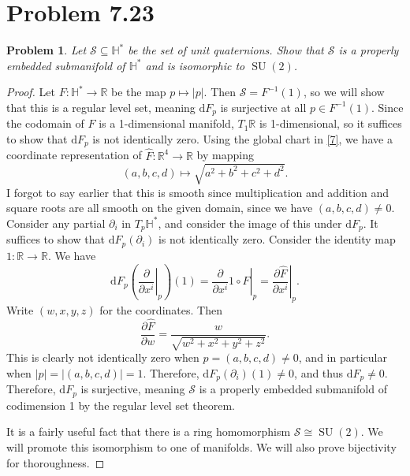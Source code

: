 \documentclass[11pt, letterpaper]{article}
\theoremstyle{plain}
\newtheorem{problem}{Problem}
\begin{document}
\section{Problem 7.23}
\begin{problem}
	Let $\mathcal{S} \subseteq \mathbb{H} ^*$ be the set of unit quaternions. Show that $\mathcal{S} $ is a properly embedded submanifold of $\mathbb{H} ^*$ and is isomorphic to $\operatorname{SU} (2)$.
\end{problem}
\begin{proof}
	Let $F : \mathbb{H} ^* \to \mathbb{R} $ be the map $p\mapsto \left| p \right| $. Then $\mathcal{S} =F^{-1} (1)$, so we will show that this is a regular level set, meaning $\mathrm{d} F_p$ is surjective at all $p\in F^{-1} (1)$. Since the codomain of $F$ is a 1-dimensional manifold, $T_1\mathbb{R} $ is 1-dimensional, so it suffices to show that $\mathrm{d} F_p$ is not identically zero. Using the global chart in \cref{7}, we have a coordinate representation of $\hat{F} : \mathbb{R} ^4 \to \mathbb{R} $ by mapping
	\[
		(a,b,c,d)\mapsto \sqrt{a^2+b^2+c^2+d^2} 
	.\]
	I forgot to say earlier that this is smooth since multiplication and addition and square roots are all smooth on the given domain, since we have $(a,b,c,d)\neq 0$. Consider any partial $\partial _i$ in $T_p\mathbb{H}^*$, and consider the image of this under $\mathrm{d} F_p$. It suffices to show that $\mathrm{d} F_p(\partial _i)$ is not identically zero. Consider the identity map $1: \mathbb{R}  \to \mathbb{R} $. We have
	\[
		\mathrm{d} F_p\left( \left. \frac{\partial }{\partial x^i} \right|_p \right) (1)=\left.\frac{\partial }{\partial x^i} 1\circ F\right|_p = \left.\frac{\partial \hat{F} }{\partial x^i} \right|_p
	.\]
	Write $(w,x,y,z)$ for the coordinates. Then
	\[
		\frac{\partial \hat{F} }{\partial w} =\frac{w}{\sqrt{w^2+x^2+y^2+z^2} } 
	.\]
	This is clearly not identically zero when $p=(a,b,c,d)\neq 0$, and in particular when $\left| p \right| =\left| (a,b,c,d) \right| =1$. Therefore, $\mathrm{d} F_p(\partial _i)(1)\neq 0$, and thus $\mathrm{d} F_p\neq 0$. Therefore, $\mathrm{d} F_p$ is surjective, meaning $\mathcal{S} $ is a properly embedded submanifold of codimension 1 by the regular level set theorem.

	It is a fairly useful fact that there is a ring homomorphism $\mathcal{S} \cong \operatorname{SU} (2)$. We will promote this isomorphism to one of manifolds. We will also prove bijectivity for thoroughness.


\end{proof}
\end{document}
